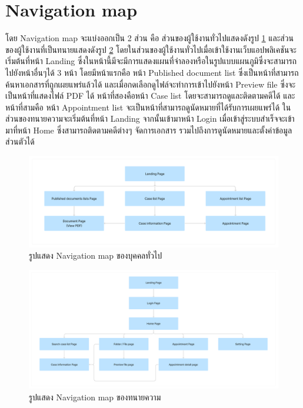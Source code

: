 \documentclass[12pt,oneside,openright,a4paper]{cpe-thai-project}
\begin{document}
\section{Navigation map}
โดย Navigation map จะแบ่งออกเป็น 2 ส่วน คือ ส่วนของผู้ใช้งานทั่วไปแสดงดังรูป \ref{fig:navMapGuest} และส่วนของผู้ใช้งานที่เป็นทนายแสดงดังรูป \ref{fig:navMapLawyer} โดยในส่วนของผู้ใช้งานทั่วไปเมื่อเข้าใช้งานเว็บแอปพลิเคชันจะเริ่มต้นที่หน้า Landing ซึ่งในหน้านี้มีจะมีการแสดงแผนที่จำลองหรือในรูปแบบแผนภูมิซึ่งจะสามารถไปยังหน้าอื่นๆได้ 3 หน้า โดยมีหน้าแรกคือ 
หน้า Published document list ซึ่งเป็นหน้าที่สามารถค้นหาเอกสารที่ถูกเผยแพร่แล้วได้ และเมื่อกดเลือกดูไฟล์จะทำการเข้าไปยังหน้า Preview file ซึ่งจะเป็นหน้าที่แสดงไฟล์ PDF ได้ หน้าที่สองคือหน้า Case list โดยจะสามารถดูและติดตามคดีได้ และหน้าที่สามคือ หน้า Appointment list จะเป็นหน้าที่สามารถดูนัดหมายที่ได้รับการเผยแพร่ได้ \hspace{1cm}ในส่วนของทนายความจะเริ่มต้นที่หน้า Landing จากนั้นเข้ามาหน้า Login เมื่อเข้าสู่ระบบสำเร็จจะเข้ามาที่หน้า Home ซึ่งสามารถติดตามคดีต่างๆ จัดการเอกสาร รวมไปถึงการดูนัดหมายและตั้งค่าข้อมูลส่วนตัวได้
\begin{figure}[!ht]\centering
    \includegraphics[width=13cm]{./assets/nav-map-guest.png}
    \caption{รูปแสดง Navigation map ของบุคคลทั่วไป}\label{fig:navMapGuest}

  \end{figure}

\begin{figure}[!ht]\centering
    \includegraphics[width=13cm]{./assets/nav-map-lawyer.png}
    \caption{รูปแสดง Navigation map ของทนายความ}\label{fig:navMapLawyer}
\end{figure}
\clearpage
\newpage
\end{document}
